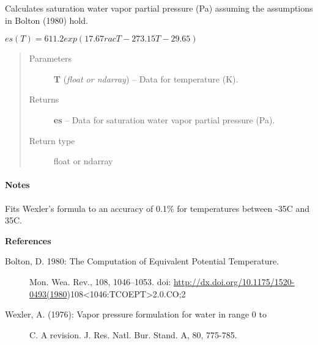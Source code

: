 \documentclass[letterpaper,10pt,english]{sphinxmanual}
\begin{document}
\begin{fulllineitems}
\label{atmos:atmos.equations.es_from_T_Bolton}
Calculates saturation water vapor partial pressure (Pa) assuming the assumptions
in Bolton (1980) hold.

\(es(T) = 611.2 exp(17.67  rac{T-273.15}{T-29.65})\)
\begin{quote}\begin{description}
\item[{Parameters}] \leavevmode
\textbf{T} (\emph{float or ndarray}) -- Data for temperature (K).

\item[{Returns}] \leavevmode
\textbf{es} --
Data for saturation water vapor partial pressure (Pa).

\item[{Return type}] \leavevmode
float or ndarray

\end{description}\end{quote}
\paragraph{Notes}

Fits Wexler's formula to an accuracy of 0.1\% for temperatures between
-35C and 35C.

\textbf{References}
\begin{description}
\item[{Bolton, D. 1980: The Computation of Equivalent Potential Temperature.}] \leavevmode
Mon. Wea. Rev., 108, 1046–1053.
doi: \href{http://dx.doi.org/10.1175/1520-0493(1980}{http://dx.doi.org/10.1175/1520-0493(1980})108\textless{}1046:TCOEPT\textgreater{}2.0.CO;2

\item[{Wexler, A. (1976): Vapor pressure formulation for water in range 0 to}]  C. A revision. J. Res. Natl. Bur. Stand. A, 80, 775-785.

\end{description}

\end{fulllineitems}

\end{document}
